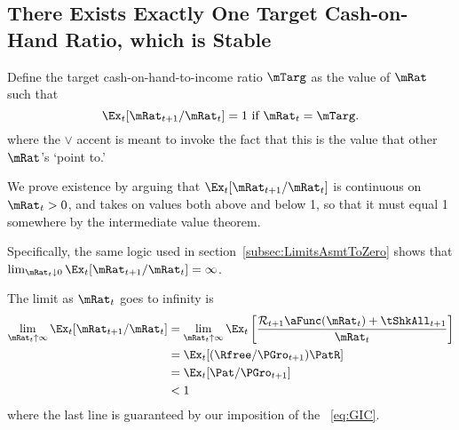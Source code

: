 \documentclass[./BufferStockTheory.tex]{subfiles}
\begin{document}
\hypertarget{onetarget}{}
\subsection{There Exists Exactly One Target Cash-on-Hand Ratio,
which is Stable}

\label{subsec:onetarget}

Define the target cash-on-hand-to-income ratio $\mTarg$ as the value of $\mRat$
such that
\begin{equation}  
\Ex_t [{\mRat}_{t+1}/\mRat_t] = 1 \mbox{~if~} \mRat_t = \mTarg. \label{eq:mTarget}
\end{equation}
where the $\vee$ accent is meant to invoke the fact that this is the value that other $\mRat$'s `point to.'

We prove existence by arguing that $\Ex_t [{\mRat}_{t+1}/\mRat_t]$ is
continuous on $\mRat_{t}>0$, %
and takes on values both above and below 1,
so that it must equal 1 somewhere by the intermediate
value theorem.

Specifically, the same logic used in section~\ref{subsec:LimitsAsmtToZero} shows
that $\lim_{\mRat_t \downarrow 0} \Ex_t [{\mRat}_{t+1}/\mRat_t] =
\infty$.

The limit as $\mRat_{t}$ goes to infinity is
\begin{align*}
  \lim_{\mRat_{t} \uparrow \infty} \Ex_{t}[{\mRat}_{t+1}/\mRat_{t}]  & =   \lim_{\mRat_{t} \uparrow \infty} \Ex_{t}\left[\frac{{\mathcal{\mathcal{R}}}_{t+1}\aFunc(\mRat_{t})+{\tShkAll}_{t+1}}{\mRat_{t}}\right]
\\  & = \Ex_{t}[(\Rfree/{\PGro}_{t+1})\PatR]
\\  & = \Ex_{t}[{\Pat}/{\PGro}_{t+1}]
\\  & < 1
\end{align*}
where the last line is guaranteed by our imposition of the \GIC~\eqref{eq:GIC}.
\end{document}
